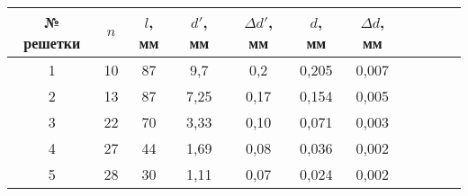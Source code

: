 \begin{tabular}{|c|c|c|c|c|c|c|c|c|c|c|}
\hline
№ решетки&$n$ &$l$, мм&$d'$, мм&$\Delta d'$, мм&$d$, мм&$\Delta d$, мм\\
\hline
1&10&87&9,7&0,2&0,205&0,007\\
\hline
2&13&87&7,25&0,17&0,154&0,005\\
\hline
3&22&70&3,33&0,10&0,071&0,003\\
\hline
4&27&44&1,69&0,08&0,036&0,002\\
\hline
5&28&30&1,11&0,07&0,024&0,002\\
\hline
\end{tabular}